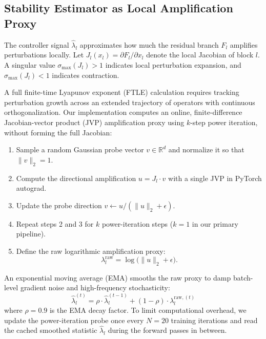 \documentclass[conference,10pt]{IEEEtran}
\begin{document}
\subsection{Stability Estimator as Local Amplification Proxy}
\label{sec:estimator}

The controller signal $\hat{\lambda}_l$ approximates how much the residual
branch $F_l$ amplifies perturbations locally. Let $J_l(x_l) = \partial F_l / \partial x_l$
denote the local Jacobian of block $l$. A singular value $\sigma_{\max}(J_l) > 1$
indicates local perturbation expansion, and $\sigma_{\max}(J_l) < 1$ indicates
contraction.

A full finite-time Lyapunov exponent (FTLE) calculation requires tracking perturbation
growth across an extended trajectory of operators with continuous orthogonalization.
Our implementation computes an online, finite-difference Jacobian-vector product
(JVP) amplification proxy using $k$-step power iteration, without forming the full Jacobian:
\begin{enumerate}
    \item Sample a random Gaussian probe vector $v \in \mathbb{R}^d$ and normalize it so that $\|v\|_2 = 1$.
    \item Compute the directional amplification $u = J_l \cdot v$ with a single JVP in PyTorch autograd.
    \item Update the probe direction $v \leftarrow u / (\|u\|_2 + \epsilon)$.
    \item Repeat steps 2 and 3 for $k$ power-iteration steps ($k=1$ in our primary pipeline).
    \item Define the raw logarithmic amplification proxy:
    \begin{equation}
        \lambda_l^{\text{raw}} = \log\bigl(\|u\|_2 + \epsilon\bigr).
    \end{equation}
\end{enumerate}

An exponential moving average (EMA) smooths the raw proxy to damp batch-level
gradient noise and high-frequency stochasticity:
\begin{equation}
    \hat{\lambda}_l^{(t)} = \rho \cdot \hat{\lambda}_l^{(t-1)} + (1 - \rho) \cdot \lambda_l^{\text{raw},(t)}
\end{equation}
where $\rho = 0.9$ is the EMA decay factor. To limit computational overhead, we update the
power-iteration probe once every $N = 20$ training iterations and read the cached smoothed
statistic $\hat{\lambda}_l$ during the forward passes in between.
\end{document}
